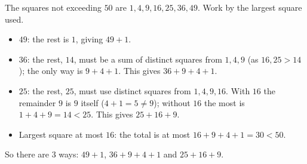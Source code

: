 The squares not exceeding $50$ are $1,4,9,16,25,36,49$. Work by the largest square used.
\begin{itemize}
\item $49$: the rest is $1$, giving $49+1$.
\item $36$: the rest, $14$, must be a sum of distinct squares from $1,4,9$ (as $16,25>14$); the only way is $9+4+1$. This gives $36+9+4+1$.
\item $25$: the rest, $25$, must use distinct squares from $1,4,9,16$. With $16$ the remainder $9$ is $9$ itself ($4+1=5\ne9$); without $16$ the most is $1+4+9=14<25$. This gives $25+16+9$.
\item Largest square at most $16$: the total is at most $16+9+4+1=30<50$.
\end{itemize}
So there are $\boxed{3}$ ways: $49+1$, $36+9+4+1$ and $25+16+9$.
